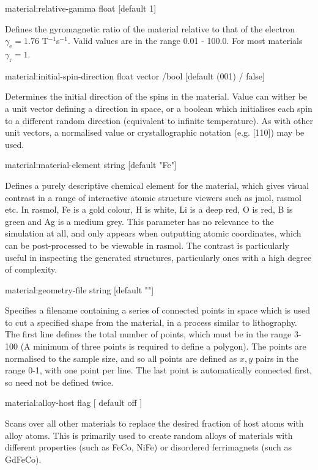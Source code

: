 
{\zicf material:relative-gamma float [default 1]} Defines the gyromagnetic ratio of the material relative to that of the electron $\gamma_{\mathrm{e}} = 1.76$ T$^{-1}$s$^{-1}$. Valid values are in the range 0.01 - 100.0. For most materials $\gamma_{\mathrm{r}} = 1$.

{\zicf material:initial-spin-direction float vector /bool [default (001) / false]} Determines the initial direction of the spins in the material. Value can wither be a unit vector defining a direction in space, or a boolean which initialises each spin to a different random direction (equivalent to infinite temperature). As with other unit vectors, a  normalised value or crystallographic notation (e.g. [110]) may be used.

{\zicf material:material-element string [default "Fe"]} Defines a purely descriptive chemical element for the material, which gives visual contrast in a range of interactive atomic structure viewers such as jmol, rasmol etc. In rasmol, Fe is a gold colour, H is white, Li is a deep red, O is red, B is green and Ag is a medium grey. This parameter has no relevance to the simulation at all, and only appears when outputting atomic coordinates, which can be post-processed to be viewable in rasmol. The contrast is particularly useful in inspecting the generated structures, particularly ones with a high degree of complexity.

{\zicf material:geometry-file string [default ""]} Specifies a filename containing a series of connected points in space which is used to cut a specified shape from the material, in a process similar to lithography. The first line defines the total number of points, which must be in the range 3-100 (A minimum of three points is required to define a polygon). The points are normalised to the sample size, and so all points are defined as $x,y$ pairs in the range 0-1, with one point per line. The last point is automatically connected first, so need not be defined twice.

{\zicf material:alloy-host flag [ default off ]} Scans over all other materials to replace the desired fraction of host atoms with alloy atoms. This is primarily used to create random alloys of materials with different properties (such as FeCo, NiFe) or disordered ferrimagnets (such as GdFeCo).

